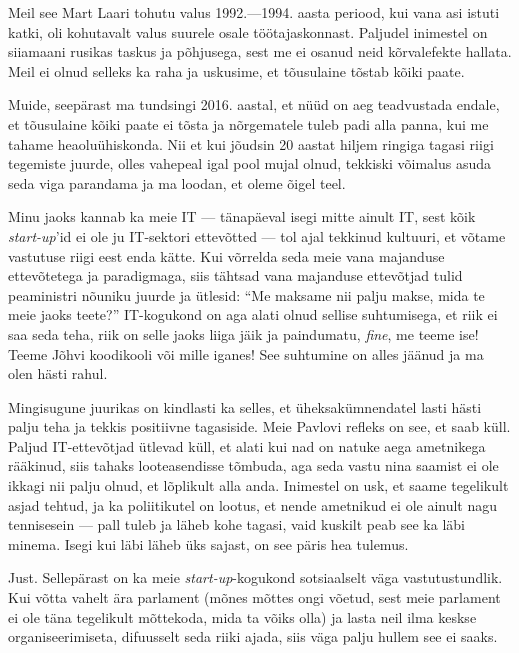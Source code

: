 Meil see Mart Laari tohutu valus 
1992.---1994. aasta periood, kui vana asi istuti katki, oli kohutavalt valus suurele 
osale töötajaskonnast. Paljudel inimestel on siiamaani rusikas taskus ja põhjusega, sest me ei osanud 
neid kõrvalefekte hallata. Meil ei olnud selleks ka raha ja 
uskusime, et tõusulaine tõstab kõiki paate.

Muide, seepärast ma tundsingi 2016. aastal, et nüüd on aeg teadvustada 
endale, et tõusulaine kõiki paate ei tõsta ja nõrgematele tuleb padi alla 
panna, kui me tahame heaoluühiskonda. Nii et kui jõudsin 20 aastat 
hiljem ringiga tagasi riigi tegemiste juurde, olles vahepeal igal pool mujal 
olnud, tekkiski võimalus asuda seda viga parandama ja ma loodan, et 
oleme õigel teel.


Minu jaoks kannab ka meie IT --- tänapäeval isegi mitte ainult IT, sest kõik 
\emph{start-up}'id ei ole ju IT-sektori ettevõtted --- tol ajal tekkinud 
kultuuri, et võtame vastutuse riigi eest enda kätte. Kui võrrelda 
seda meie vana majanduse ettevõtetega ja paradigmaga, siis tähtsad vana majanduse 
ettevõtjad tulid peaministri nõuniku juurde ja ütlesid: \enquote{Me maksame nii palju makse, mida te meie jaoks teete?} 
IT-kogukond on aga alati olnud sellise suhtumisega, et riik ei saa seda 
teha, riik on selle jaoks liiga jäik ja paindumatu, \emph{fine}, me teeme ise! 
Teeme Jõhvi koodikooli või mille iganes! See suhtumine on alles jäänud ja ma 
olen hästi rahul. 

Mingisugune juurikas on kindlasti ka selles, et 
üheksakümnendatel lasti hästi palju teha ja tekkis positiivne tagasiside. 
Meie Pavlovi refleks on see, et saab küll. Paljud 
IT-ettevõtjad ütlevad küll, et alati kui nad on natuke aega ametnikega rääkinud, siis tahaks looteasendisse tõmbuda, aga seda vastu nina saamist ei ole ikkagi 
nii palju olnud, et lõplikult alla anda. Inimestel on 
usk, et saame tegelikult asjad tehtud, ja ka poliitikutel 
on lootus, et nende ametnikud ei ole ainult nagu tennisesein --- pall tuleb ja 
läheb kohe tagasi, vaid kuskilt peab see ka läbi minema. Isegi kui 
läbi läheb üks sajast, on see päris hea tulemus.


Just. Sellepärast on ka meie \emph{start-up}-kogukond sotsiaalselt väga
vastutustundlik. Kui võtta vahelt ära parlament (mõnes
mõttes ongi võetud, sest meie parlament ei ole täna tegelikult mõttekoda, 
mida ta võiks olla) ja lasta neil ilma keskse organiseerimiseta, difuusselt 
seda riiki ajada, siis väga palju hullem see ei saaks.


